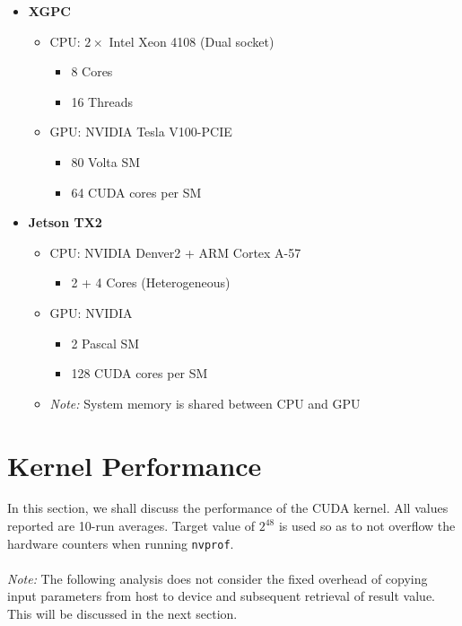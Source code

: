 \documentclass[a4paper,12pt]{article}
\begin{document}
\begin{itemize}
  \item \textbf{XGPC}
  \begin{itemize}
    \item CPU: $2 \times$ Intel Xeon 4108 (Dual socket)
    \begin{itemize}
      \item 8 Cores
      \item 16 Threads
    \end{itemize}
    \item GPU: NVIDIA Tesla V100-PCIE
    \begin{itemize}
      \item 80 Volta SM
      \item 64 CUDA cores per SM
    \end{itemize}
  \end{itemize}
  \item \textbf{Jetson TX2}
  \begin{itemize}
    \item CPU: NVIDIA Denver2 + ARM Cortex A-57
    \begin{itemize}
      \item 2 + 4 Cores (Heterogeneous)
    \end{itemize}
    \item GPU: NVIDIA
    \begin{itemize}
      \item 2 Pascal SM
      \item 128 CUDA cores per SM
    \end{itemize}
    \item \textit{Note:} System memory is shared between CPU and GPU
  \end{itemize}
\end{itemize}

\section{Kernel Performance}

In this section, we shall discuss the performance of the CUDA kernel. All values reported are 10-run averages. Target value of $2^{48}$ is used so as to not overflow the hardware counters when running \texttt{nvprof}.\\
\\
\textit{Note:} The following analysis does not consider the fixed overhead of copying input parameters from host to device and subsequent retrieval of result value. This will be discussed in the next section.
\end{document}
